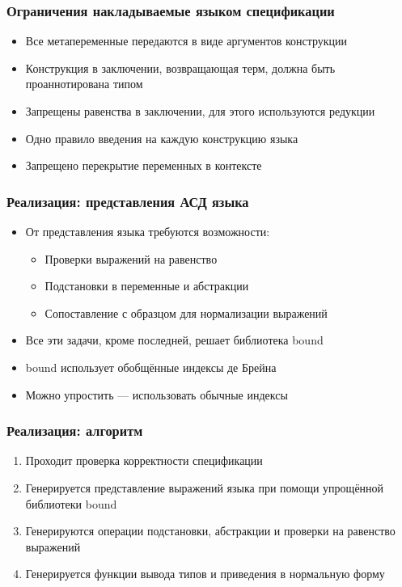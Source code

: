 \begin{frame}
\frametitle{Ограничения накладываемые языком спецификации}
\begin{itemize}
\item Все метапеременные передаются в виде аргументов конструкции
\item Конструкция в заключении, возвращающая терм, должна быть проаннотирована типом
\item Запрещены равенства в заключении, для этого используются редукции
\item Одно правило введения на каждую конструкцию языка
\item Запрещено перекрытие переменных в контексте
\end{itemize}
\end{frame}
\begin{frame}
\frametitle{Реализация: представления АСД языка}
\begin{itemize}
\item От представления языка требуются возможности:
  \begin{itemize}
    \item Проверки выражений на равенство
    \item Подстановки в переменные и абстракции
    \item Сопоставление с образцом для нормализации выражений
  \end{itemize}
\item Все эти задачи, кроме последней, решает библиотека bound
\item bound использует обобщённые индексы де Брейна
\item Можно упростить --- использовать обычные индексы
\end{itemize}
\end{frame}
\begin{frame}
\frametitle{Реализация: алгоритм}
\begin{enumerate}
\item Проходит проверка корректности спецификации
\item Генерируется представление выражений языка при помощи упрощённой библиотеки bound
\item Генерируются операции подстановки, абстракции и проверки на равенство выражений
\item Генерируется функции вывода типов и приведения в нормальную форму
\end{enumerate}
\end{frame}

